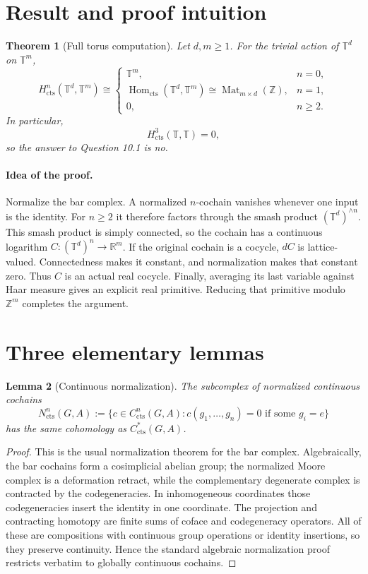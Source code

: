 \documentclass[11pt]{article}
\newtheorem{theorem}{Theorem}
\newtheorem{lemma}[theorem]{Lemma}
\newcommand{\T}{\mathbb T}
\newcommand{\R}{\mathbb R}
\newcommand{\Z}{\mathbb Z}
\newcommand{\cts}{\mathrm{cts}}
\newcommand{\Hom}{\operatorname{Hom}}
\begin{document}
\section{Result and proof intuition}

\begin{theorem}[Full torus computation]\label{thm:main}
Let $d,m\ge1$.  For the trivial action of $\T^d$ on $\T^m$,
\[
H^n_{\cts}(\T^d,\T^m)\cong
\begin{cases}
\T^m,&n=0,\\
\Hom_{\cts}(\T^d,\T^m)
 \cong\operatorname{Mat}_{m\times d}(\Z),&n=1,\\
0,&n\ge2.
\end{cases}
\]
In particular,
\[
\boxed{H^3_{\cts}(\T,\T)=0,}
\]
so the answer to Question 10.1 is no.
\end{theorem}

\paragraph{Idea of the proof.}
Normalize the bar complex.  A normalized $n$-cochain vanishes whenever one
input is the identity.  For $n\ge2$ it therefore factors through the smash
product $(\T^d)^{\wedge n}$.  This smash product is simply connected, so the
cochain has a continuous logarithm $C:(\T^d)^n\to\R^m$.  If the original
cochain is a cocycle, $dC$ is lattice-valued.  Connectedness makes it
constant, and normalization makes that constant zero.  Thus $C$ is an actual
real cocycle.  Finally, averaging its last variable against Haar measure gives
an explicit real primitive.  Reducing that primitive modulo $\Z^m$ completes
the argument.

\section{Three elementary lemmas}

\begin{lemma}[Continuous normalization]\label{lem:normalization}
The subcomplex of normalized continuous cochains
\[
N^n_{\cts}(G,A):=
\{c\in C^n_{\cts}(G,A):c(g_1,\ldots,g_n)=0
\text{ if some }g_i=e\}
\]
has the same cohomology as $C^*_{\cts}(G,A)$.
\end{lemma}

\begin{proof}
This is the usual normalization theorem for the bar complex.  Algebraically,
the bar cochains form a cosimplicial abelian group; the normalized Moore
complex is a deformation retract, while the complementary degenerate complex
is contracted by the codegeneracies.  In inhomogeneous coordinates those
codegeneracies insert the identity in one coordinate.  The projection and
contracting homotopy are finite sums of coface and codegeneracy operators.
All of these are compositions with continuous group operations or identity
insertions, so they preserve continuity.  Hence the standard algebraic
normalization proof restricts verbatim to globally continuous cochains.
\end{proof}
\end{document}
